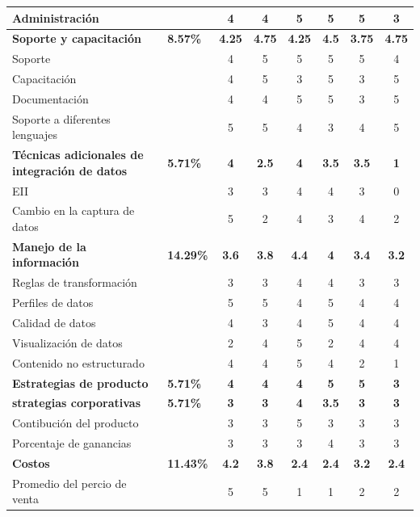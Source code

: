 \documentclass[a4paper,openright,12pt]{book}
\begin{document}
\begin{table}[htbp]
\begin{center}
{\begin{tabular}{|p{5.5cm}|>{\centering\arraybackslash}m{1.7cm}|c|c|c|c|c|c|}
\hline 
Administraci\'on & & 4 & 4 & 5 & 5 & 5 & 3\\
\hline
\rowcolor[gray]{0.9}\textbf{Soporte y capacitaci\'on} & \textbf{8.57\%} & \textbf{4.25} & \textbf{4.75} & \textbf{4.25} & \textbf{4.5} & \textbf{3.75} & \textbf{4.75}\\
\hline
Soporte & & 4 & 5 & 5 & 5 & 5 & 4\\
\hline
Capacitaci\'on & & 4 & 5 & 3 & 5 & 3 & 5\\
\hline
Documentaci\'on & & 4 & 4 & 5 & 5 & 3 & 5\\
\hline
Soporte a diferentes lenguajes & & 5 & 5 & 4 & 3 & 4 & 5\\
\hline
\rowcolor[gray]{0.9}\textbf{T\'ecnicas adicionales de integraci\'on de datos} & \textbf{5.71\%} &\textbf{ 4} & \textbf{2.5} & \textbf{4} & \textbf{3.5} & \textbf{3.5} & \textbf{1}\\
\hline
EII & & 3 & 3 & 4 & 4 & 3 & 0\\
\hline
Cambio en la captura de datos & & 5 & 2 & 4 & 3 & 4 & 2\\
\hline
\rowcolor[gray]{0.9}\textbf{Manejo de la informaci\'on} & \textbf{14.29\%} & \textbf{3.6} & \textbf{3.8} & \textbf{4.4} & \textbf{4} & \textbf{3.4} & \textbf{3.2}\\
\hline
Reglas de transformaci\'on & & 3 & 3 & 4 & 4 & 3 & 3\\
\hline
Perfiles de datos & & 5 & 5 & 4 & 5 & 4 & 4\\
\hline
Calidad de datos & & 4 & 3 & 4 & 5 & 4 & 4\\
\hline
Visualizaci\'on de datos & & 2 & 4 & 5 & 2 & 4 & 4\\
\hline
Contenido no estructurado & & 4 & 4 & 5 & 4 & 2 & 1\\
\hline
\rowcolor[gray]{0.9}\textbf{Estrategias de producto} & \textbf{5.71\%} & \textbf{4} & \textbf{4} & \textbf{4} & \textbf{5} & \textbf{5} & \textbf{3}\\
\hline
\rowcolor[gray]{0.9}\textbf{strategias corporativas} & \textbf{5.71\%} & \textbf{3} &\textbf{ 3} & \textbf{4} & \textbf{3.5} & \textbf{3} & \textbf{3}\\
\hline
Contibuci\'on del producto & & 3 & 3 & 5 & 3 & 3 & 3\\
\hline
Porcentaje de ganancias & & 3 & 3 & 3 & 4 & 3 & 3\\
\hline
\rowcolor[gray]{0.9}\textbf{Costos} & \textbf{11.43\%} & \textbf{4.2} & \textbf{3.8} & \textbf{2.4} & \textbf{2.4} & \textbf{3.2} & \textbf{2.4}\\
\hline
Promedio del percio de venta & & 5 & 5 & 1 & 1 & 2 & 2\\

\end{tabular}}
\end{center}
\end{table}
\end{document}
